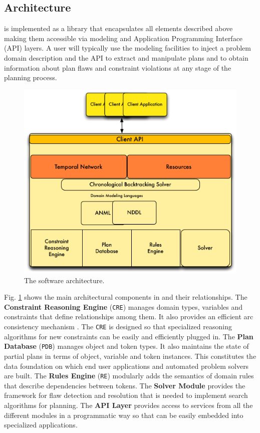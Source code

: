 \subsection{Architecture}
\label{sec:europa:arch}

\eu is implemented as a library that encapsulates all elements
described above making them accessible via modeling and Application
Programming Interface (API) layers.  A user will typically use the
modeling facilities to inject a problem domain description and the
API to extract and manipulate plans and to obtain information about
plan flaws and constraint violations at any stage of the planning
process.

\begin{figure}[b]
\centering
\includegraphics[scale=0.5]{figs/EUROPA-Architecture.pdf}
\caption{\small The \eu software architecture.}
\label{fig:europa-architecture}
\end{figure}

Fig. \ref{fig:europa-architecture} shows the main architectural
components in \eu and their relationships. The \textbf{Constraint
  Reasoning Engine} (\texttt{CRE}) manages domain types, variables and
constraints that define relationships among them. It also provides an
efficient arc consistency mechanism \cite{mackworth77}. The
\texttt{CRE} is designed so that specialized reasoning algorithms for
new constraints can be easily and efficiently plugged in. The
\textbf{Plan Database} (\texttt{PDB}) manages object and token
types. It also maintains the state of partial plans in terms of
object, variable and token instances. This constitutes the data
foundation on which end user applications and automated problem
solvers are built. The \textbf{Rules Engine} (\texttt{RE}) modularly
adds the semantics of domain rules that describe dependencies between
tokens. The \textbf{Solver Module} provides the framework for flaw
detection and resolution that is needed to implement search algorithms
for planning. The \textbf{API Layer} provides access to services from
all the different modules in a programmatic way so that \eu can be
easily embedded into specialized applications.

